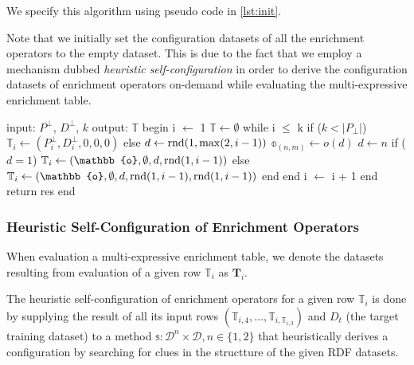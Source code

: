 We specify this algorithm using pseudo code in \autoref{lst:init}.

Note that we initially set the configuration datasets of all the enrichment operators to the empty dataset.
This is due to the fact that we employ a mechanism dubbed \emph{heuristic self-configuration} in order to derive the configuration datasets of enrichment operators on-demand while evaluating the multi-expressive enrichment table.

\begin{myfloat}[!p]
\begin{algorithm}[caption={[Random generation of multi-expressive enrichment tables]%
Random generation of multi-expressive enrichment tables. %
$P^\bot$ is the set of dataset emitters to be used. %
$D^\bot$ is the set of configuration datasets to be used for the dataset emitters. %
$o(m)$ is a function that returns a random enrichment operators with a maximum in-degree of {$m\in [1,2]$}. %
$k$ is the number of rows to be generated. %
$ \rnd(a,b) $ is a function returning a random number in {$[a,b]$}%
}, label={lst:init}]
 input: $P^\bot$, $D^\bot$, $k$
 output: $\mathbb{T}$
 begin
   i $\gets$ 1 %
   $\mathbb{T} \gets \emptyset$ %
   while i $\leq$ k 
     if ($k < |P_\bot|$) %
       $\mathbb{T}_i \gets (P^{\bot}_i, D^{\bot}_i, 0, 0, 0)$ 
     else
       $d \gets \operatorname*{rnd}(1,\max(2, i-1))$
       $\mathbb{o}_{(n,m)} \gets o(d)$
       $d \gets n$
       if ($d = 1$)
         $\mathbb{T}_i \gets (\mathbb{o}, \emptyset, d, \rnd(1,i-1))$       
       else
         $\mathbb{T}_i \gets (\mathbb{o}, \emptyset, d, \rnd(1,i-1), \rnd(1,i-1))$      
       end
     end
     i $\gets$ i + 1      
   end
   return res
 end       
\end{algorithm}
\end{myfloat}

\subsubsection{Heuristic Self-Configuration of Enrichment Operators}
\label{ssec:selfconfig}

When evaluation a multi-expressive enrichment table, we denote the datasets resulting from evaluation of a given row $\mathbb{T}_i$ as $\mathbf{T}_i$.

The heuristic self-configuration of enrichment operators for a given row $\mathbb{T}_i$ is done by supplying the result of all its input rows $\left(\mathbb{T}_{i, 4}, \dots, \mathbb{T}_{i, \mathbb{T}_{i, 3}} \right)$ and $D_t$ (the target training dataset) to a method $\mathbb{s} \colon \mathcal{D}^n\times\mathcal{D}, n\in\{1,2\}$ that heuristically derives a configuration by searching for clues in the structture of the given \ac{RDF} datasets.


